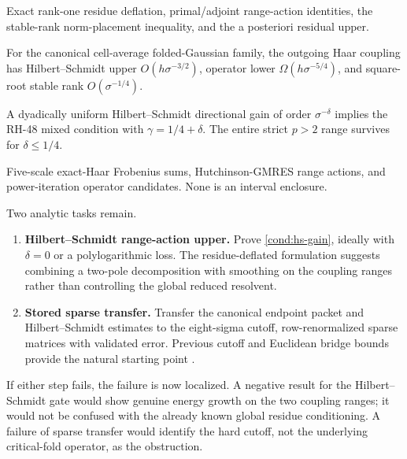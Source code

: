 \documentclass[11pt]{article}
\theoremstyle{definition}
\theoremstyle{remark}
\begin{document}
\begin{description}[leftmargin=4.1cm,style=nextline]
 \item[Proved operator algebra]
 Exact rank-one residue deflation, primal/adjoint range-action identities,
 the stable-rank norm-placement inequality, and the a posteriori residual
 upper.

 \item[Proved endpoint analysis]
 For the canonical cell-average folded-Gaussian family, the outgoing Haar
 coupling has Hilbert--Schmidt upper \(O(h\sigma^{-3/2})\), operator lower
 \(\Omega(h\sigma^{-5/4})\), and square-root stable rank
 \(O(\sigma^{-1/4})\).

 \item[Conditional small-noise theorem]
 A dyadically uniform Hilbert--Schmidt directional gain of order
 \(\sigma^{-\delta}\) implies the RH-48 mixed condition with
 \(\gamma=1/4+\delta\).  The entire strict \(p>2\) range survives for
 \(\delta\le1/4\).

 \item[Floating evidence]
 Five-scale exact-Haar Frobenius sums, Hutchinson-GMRES range actions, and
 power-iteration operator candidates.  None is an interval enclosure.
\end{description}

Two analytic tasks remain.

\begin{enumerate}[leftmargin=2.2em]
 \item \textbf{Hilbert--Schmidt range-action upper.}
 Prove \cref{cond:hs-gain}, ideally with \(\delta=0\) or a polylogarithmic
 loss.  The residue-deflated formulation suggests combining a two-pole
 decomposition with smoothing on the coupling ranges rather than controlling
 the global reduced resolvent.

 \item \textbf{Stored sparse transfer.}
 Transfer the canonical endpoint packet and Hilbert--Schmidt estimates to
 the eight-sigma cutoff, row-renormalized sparse matrices with validated
 error.  Previous cutoff and Euclidean bridge bounds provide the natural
 starting point \citep{WangHaar2026,WangSmallNoiseMesh2026}.
\end{enumerate}

If either step fails, the failure is now localized.  A negative result for
the Hilbert--Schmidt gate would show genuine energy growth on the two coupling
ranges; it would not be confused with the already known global residue
conditioning.  A failure of sparse transfer would identify the hard cutoff,
not the underlying critical-fold operator, as the obstruction.
\end{document}
